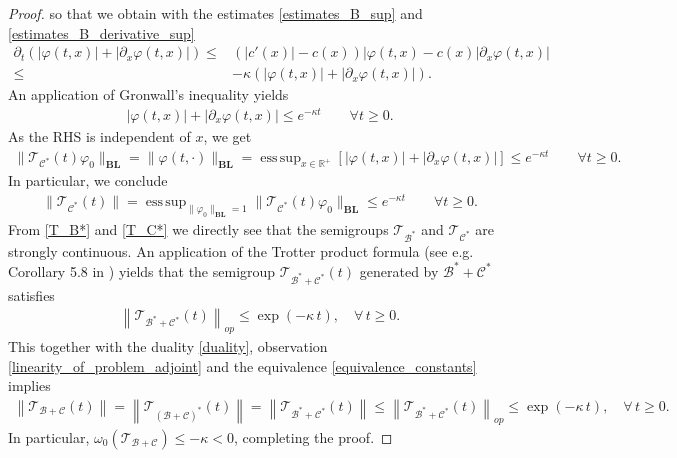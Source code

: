 \documentclass[12pt,a4paper]{amsart}
\newcommand{\BLN}{\mathbf{BL}}
\DeclareMathOperator*{\esssup}{ess\,sup}
\renewcommand{\phi}{\varphi}
\newcommand{\R}{\mathbb{R}}
\begin{document}
\begin{proof}
    
so that we obtain with the estimates \eqref{estimates_B_sup} and \eqref{estimates_B_derivative_sup}
    \begin{align*}
    \partial_t \left( |\phi(t,x)| + |\partial_x \phi(t,x)|\right)  \leq& (|c'(x)|-c(x))|\varphi(t,x)-c(x)|\partial_x\varphi(t,x)|\\
    \leq& -\kappa\left( |\varphi(t,x)| + |\partial_x \varphi(t,x)|\right).
    \end{align*}
An application of Gronwall's inequality yields
    \begin{align*}
    |\varphi(t,x)| + |\partial_x \varphi(t,x)|\leq e^{-\kappa t}\qquad \forall t\geq 0.
    \end{align*}
As the RHS is independent of $x$, we get 
    \begin{align*}
        \|\mathcal{T}_{\mathcal{C}^*}(t)\varphi_0\|_{\BLN}=\|\varphi(t,\cdot)\|_{\BLN}=\esssup_{x\in \R^+}\left[|\varphi(t,x)| + |\partial_x \varphi(t,x)|\right]\leq e^{-\kappa t}\qquad \forall t\geq 0.
    \end{align*}
In particular, we conclude
    \begin{align*}
    \|\mathcal{T}_{\mathcal{C}^*}(t)\|=\esssup_{\|\varphi_0\|_{\BLN}=1}\|\mathcal{T}_{\mathcal{C}^*}(t)\varphi_0\|_{\BLN}\leq e^{-\kappa t} \qquad \forall t\geq 0.
    \end{align*}      
\fi
From \eqref{T_B*} and \eqref{T_C*} we directly see that the semigroups $\mathcal{T}_{\mathcal{B}^*}$ and $\mathcal{T}_{\mathcal{C}^*}$ are strongly continuous. An application of the Trotter product formula (see e.g. Corollary 5.8  in \cite[Ch.III]{EngelNagel}) yields that the semigroup $\mathcal{T}_{\mathcal{B}^*+\mathcal{C}^*}(t)$ generated by $\mathcal{B}^*+\mathcal{C}^*$ satisfies 
    \begin{align*}
    \left\|\mathcal{T}_{\mathcal{B}^*+\mathcal{C}^*}(t)\right\|_{op}\le \exp\left(-\kappa\,t\right),\quad \forall\,t\ge 0.
    \end{align*}
This together with the duality \eqref{duality}, observation \eqref{linearity_of_problem_adjoint} and the equivalence \eqref{equivalence_constants} implies 
    \begin{align*}
    \left\|\mathcal{T}_{\mathcal{B}+\mathcal{C}}(t)\right\|=\left\|\mathcal{T}_{(\mathcal{B}+\mathcal{C})^*}(t)\right\|
    =\left\|\mathcal{T}_{\mathcal{B}^*+\mathcal{C}^*}(t)\right\|\leq \left\|\mathcal{T}_{\mathcal{B}^*+\mathcal{C}^*}(t)\right\|_{op}
    \le \exp\left(-\kappa\,t\right),\quad \forall\,t\ge 0.
    \end{align*}
In particular,  $\omega_0\left(\mathcal{T}_{\mathcal{B}+\mathcal{C}}\right)\le -\kappa<0$, completing the proof.
\end{proof}
\end{document}
